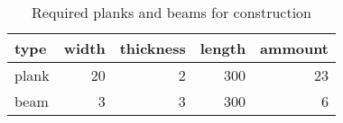 \begin{table}[h!]
\centering
\caption{Required planks and beams for construction}
\begin{tabular}{lrrrr}
\toprule
 type &  width &  thickness &  length &  ammount \\
\midrule
plank &     20 &          2 &     300 &       23 \\
 beam &      3 &          3 &     300 &        6 \\
\bottomrule
\end{tabular}
\end{table}
